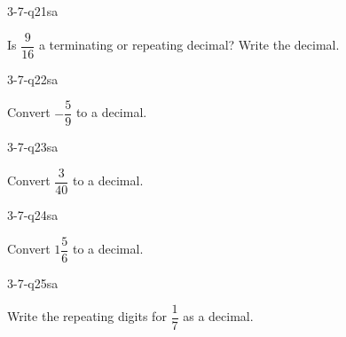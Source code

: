 \begin{practiceQuestion}{3-7-q21}{sa}
\begin{questionText}
Is $\dfrac{9}{16}$ a terminating or repeating decimal? Write the decimal.
\end{questionText}
\end{practiceQuestion}

\begin{practiceQuestion}{3-7-q22}{sa}
\begin{questionText}
Convert $-\dfrac{5}{9}$ to a decimal.
\end{questionText}
\end{practiceQuestion}

\begin{practiceQuestion}{3-7-q23}{sa}
\begin{questionText}
Convert $\dfrac{3}{40}$ to a decimal.
\end{questionText}
\end{practiceQuestion}

\begin{practiceQuestion}{3-7-q24}{sa}
\begin{questionText}
Convert $1\dfrac{5}{6}$ to a decimal.
\end{questionText}
\end{practiceQuestion}

\begin{practiceQuestion}{3-7-q25}{sa}
\begin{questionText}
Write the repeating digits for $\dfrac{1}{7}$ as a decimal.
\end{questionText}
\end{practiceQuestion}


